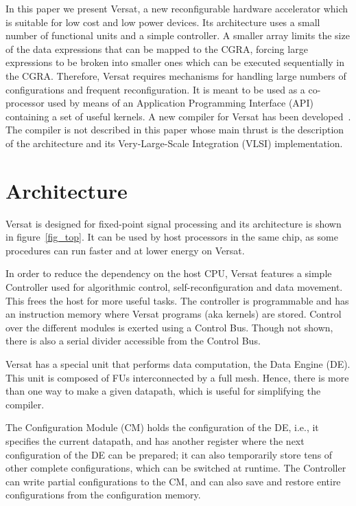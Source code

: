 \documentclass[journal]{IEEEtran}
\begin{document}
In this paper we present Versat, a new reconfigurable hardware
accelerator which is suitable for low cost and low power devices. Its
architecture uses a small number of functional units and a simple
controller. A smaller array limits the size of the data expressions
that can be mapped to the CGRA, forcing large expressions to be broken
into smaller ones which can be executed sequentially in the
CGRA. Therefore, Versat requires mechanisms for handling large numbers
of configurations and frequent reconfiguration. It is meant to be used
as a co-processor used by means of an Application Programming
Interface (API) containing a set of useful kernels. A new compiler for
Versat has been developed~\cite{Santiago2016}. The compiler is not
described in this paper whose main thrust is the description of the
architecture and its Very-Large-Scale Integration (VLSI)
implementation.


\section{Architecture}

Versat is designed for fixed-point signal processing and its
architecture is shown in figure~\ref{fig_top}. It can be used by host
processors in the same chip, as some procedures can run faster and at
lower energy on Versat.

In order to reduce the dependency on the host CPU, Versat features a
simple Controller used for algorithmic control, self-reconfiguration
and data movement. This frees the host for more useful tasks. The
controller is programmable and has an instruction memory where Versat
programs (aka kernels) are stored. Control over the different modules
is exerted using a Control Bus. Though not shown, there is also a
serial divider accessible from the Control Bus.

Versat has a special unit that performs data computation, the Data
Engine (DE). This unit is composed of FUs interconnected by a full
mesh. Hence, there is more than one way to make a given datapath,
which is useful for simplifying the compiler.

The Configuration Module (CM) holds the configuration of the DE, i.e.,
it specifies the current datapath, and has another register where the
next configuration of the DE can be prepared; it can also temporarily
store tens of other complete configurations, which can be switched at
runtime. The Controller can write partial configurations to the CM,
and can also save and restore entire configurations from the
configuration memory.
\end{document}
